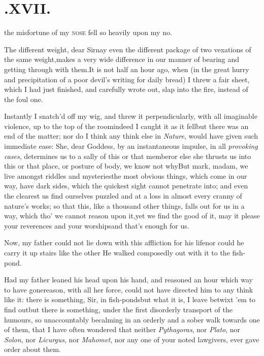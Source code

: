 \documentclass{article}
\begin{document}
\null\smallskip
\section{.\enspace XVII.}

 the misfortune of my\break
\textsc{nose} fell so heavily upon my\break
{}
\break
no.

The different weight, dear Sir\tsh nay even the
different package of two vexations of the same
weight,\tsh makes a very wide difference in our manner of
bearing and getting through with them.\tsk It is not half
an hour ago, when (in the great hurry and precipitation of a poor
devil’s writing for daily bread) I threw a fair sheet, which
I had just finished, and carefully wrote out, slap into the fire,
instead of the foul one.

Instantly I snatch’d off my wig, and threw it
perpendicularly, with all imaginable violence, up to the top of the
room\break\tsk indeed I caught it as it fell\tsk but there was
an end of the matter; nor do I think any think else in
\textit{Nature}, would have given such immediate ease: She, dear
Goddess, by an instantaneous impulse, in all \textit{provoking
cases}, determines us to a sally of this or that member\tsk or
else she thrusts us into this or that place, or posture of body, we
know not why\tsk But mark, madam, we live amongst riddles
and mysteries\tsk the most obvious things, which come in
our way, have dark sides, which the quickest sight cannot penetrate
into; and even the clearest 
us find ourselves puzzled and at a loss in almost every cranny of
nature’s works; so that this, like a thousand other things,
falls out for us in a way, which tho’ we cannot reason upon
it,\tsk yet we find the good of it, may it please your reverences
and your worships\tsh and that’s enough for us.

Now, my father could not lie down with this affliction for his
life\tsk nor could he carry it up stairs like the other\tsk
He walked composedly out with it to the fish-pond.

Had my father leaned his head upon his hand, and reasoned an
hour which way to have gone\tsk reason, with all her
force, could not have directed him to any think like it: there is
something, Sir, in fish-ponds\tsk but what it is, I leave\break
{} betwixt ’em to find
out\tsk but there is something, under the first disorderly\break
transport of the humours, so unaccountably becalming in an orderly
and a sober walk towards one of them, that I have often wondered
that neither \textit{Pythagoras}, nor \textit{Plato}, nor \textit{Solon},
nor \textit{Licurgus}, nor \textit{Mahomet}, nor any one of your noted
lawgivers, ever gave order about them.
\end{document}
